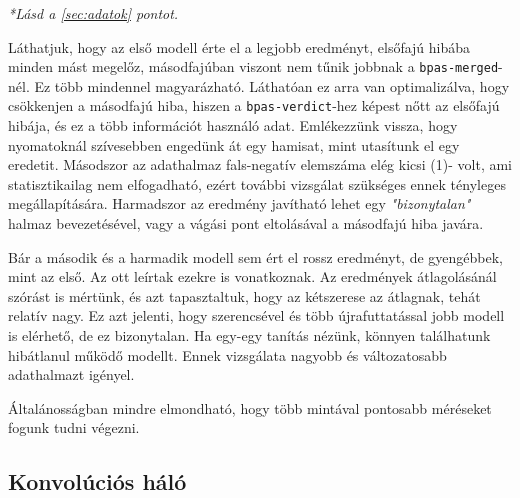 \mbox{}


\textit{*Lásd a \ref{sec:adatok} pontot.}

\mbox{}



Láthatjuk, hogy az első modell érte el a legjobb eredményt, elsőfajú hibába minden mást megelőz, 
másodfajúban viszont nem tűnik jobbnak a \texttt{bpas-merged}-nél. Ez több mindennel magyarázható.
Láthatóan ez arra van optimalizálva, hogy csökkenjen a másodfajú hiba, hiszen a 
\texttt{bpas-verdict}-hez képest nőtt az elsőfajú hibája, és ez a több információt használó adat.
Emlékezzünk vissza, hogy nyomatoknál szívesebben engedünk át egy hamisat, mint utasítunk
el egy eredetit. Másodszor az adathalmaz fals-negatív elemszáma elég kicsi (1)- volt, ami 
statisztikailag nem elfogadható, ezért további vizsgálat szükséges ennek tényleges megállapítására.
Harmadszor az eredmény javítható lehet egy \textit{"bizonytalan"} halmaz bevezetésével, vagy 
a vágási pont eltolásával a másodfajú hiba javára.


Bár a második és a harmadik modell sem ért el rossz eredményt, de gyengébbek, mint az első. Az ott leírtak ezekre is vonatkoznak. Az eredmények átlagolásánál szórást is mértünk, és azt tapasztaltuk, 
hogy az kétszerese az átlagnak, tehát relatív nagy. Ez azt jelenti, hogy szerencsével és több 
újrafuttatással jobb modell is elérhető, de ez bizonytalan. Ha egy-egy tanítás nézünk, könnyen
találhatunk hibátlanul működő modellt. Ennek vizsgálata nagyobb és változatosabb adathalmazt igényel.

Általánosságban mindre elmondható, hogy több mintával pontosabb méréseket fogunk tudni végezni.



%
%
%
%


%

\newpage
\subsection{Konvolúciós háló}

